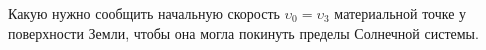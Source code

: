 Какую нужно сообщить начальную скорость $\upsilon_0=\upsilon_3$ материальной точке у поверхности Земли, чтобы она могла 
покинуть пределы Солнечной системы.
